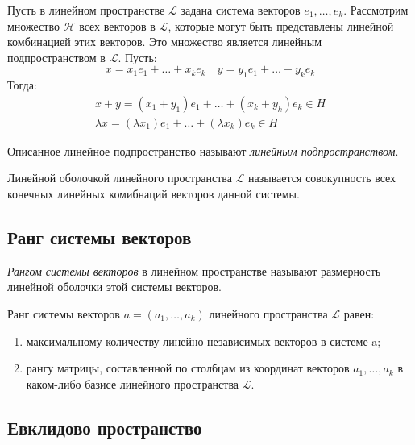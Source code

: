 Пусть в линейном пространстве $\mathcal{L}$ задана система векторов $e_1, \ldots, e_k$. Рассмотрим множество $\mathcal{H}$ всех векторов в $\mathcal{L}$, которые могут быть представлены линейной комбинацией этих векторов. Это множество является линейным подпространством в $\mathcal{L}$.
Пусть: \[
  x = x_1 e_1 + \ldots + x_k e_k \quad y = y_1 e_1 + \ldots + y_k e_k
\] 
Тогда:
\begin{gather*}
  x + y = \left(x_1 + y_1\right) e_1 + \ldots + \left( x_k + y_k \right) e_k \in H \\
  \lambda x = \left( \lambda x_1 \right) e_1 + \ldots + \left( \lambda x_k \right) e_k \in H
\end{gather*}

Описанное линейное подпространство называют \textit{линейным подпространством}. 

\begin{definition}
  Линейной оболочкой линейного пространства $\mathcal{L}$ называется совокупность всех конечных линейных комибнаций векторов данной системы.
\end{definition}

\subsection{Ранг системы векторов}

\begin{definition}
  \textit{Рангом системы векторов} в линейном пространстве называют размерность линейной оболочки этой системы векторов.
\end{definition}

\begin{theorem}
  Ранг системы векторов $a = (a_1, \ldots, a_k)$ линейного пространства $\mathcal{L}$ равен:
  \begin{enumerate}
    \item максимальному количеству линейно независимых векторов в системе a;
    \item рангу матрицы, составленной по столбцам из координат векторов $a_1,\ldots, a_k$ в каком-либо базисе линейного пространства $\mathcal{L}$.
  \end{enumerate}
\end{theorem}

\subsection{Евклидово пространство}

